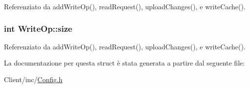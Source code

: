 Referenziato da add\+Write\+Op(), read\+Request(), upload\+Changes(), e write\+Cache().

\subsubsection[{\texorpdfstring{size}{size}}]{\setlength{\rightskip}{0pt plus 5cm}int Write\+Op\+::size}\hypertarget{structWriteOp_af804d8a1e3d428ee7275b5e4f467d23a}{}\label{structWriteOp_af804d8a1e3d428ee7275b5e4f467d23a}


Referenziato da add\+Write\+Op(), read\+Request(), upload\+Changes(), e write\+Cache().



La documentazione per questa struct è stata generata a partire dal seguente file\+:\begin{DoxyCompactItemize}
\item 
Client/inc/\hyperlink{Client_2inc_2Config_8h}{Config.\+h}\end{DoxyCompactItemize}
